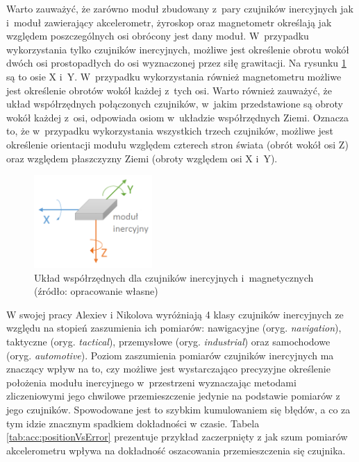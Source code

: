 Warto zauważyć, że zarówno moduł zbudowany z~pary czujników inercyjnych jak i~moduł zawierający akcelerometr, żyroskop oraz magnetometr określają jak względem poszczególnych osi obrócony jest dany moduł. W~przypadku wykorzystania tylko czujników inercyjnych, możliwe jest określenie obrotu wokół dwóch osi prostopadłych do osi wyznaczonej przez siłę grawitacji. Na rysunku \ref{fig:literature:imu:coordination} są to osie X i~Y. W~przypadku wykorzystania również magnetometru możliwe jest określenie obrotów wokół każdej z~tych osi. Warto również zauważyć, że układ współrzędnych połączonych czujników, w~jakim przedstawione są obroty wokół każdej z~osi, odpowiada osiom w~układzie współrzędnych Ziemi. Oznacza to, że w~przypadku wykorzystania wszystkich trzech czujników, możliwe jest określenie orientacji modułu względem czterech stron świata (obrót wokół osi Z) oraz względem płaszczyzny Ziemi (obroty względem osi X i~Y).
			 
\begin{savenotes}
	\begin{figure}[!htb]
		\centering	
		\includegraphics[width=0.4\textwidth]{images/IMUAxes.png}
		\caption{Układ współrzędnych dla czujników inercyjnych i~magnetycznych (źródło: opracowanie własne)}
		\label{fig:literature:imu:coordination}
	\end{figure}
\end{savenotes}

W swojej pracy Alexiev i Nikolova \cite{Alexiev2013} wyróżniają 4 klasy czujników inercyjnych ze względu na stopień zaszumienia ich pomiarów: nawigacyjne (oryg. \emph{navigation}), taktyczne (oryg. \emph{tactical}), przemysłowe (oryg. \emph{industrial}) oraz samochodowe (oryg. \emph{automotive}). Poziom zaszumienia pomiarów czujników inercyjnych ma znaczący wpływ na to, czy możliwe jest wystarczająco precyzyjne określenie położenia modułu inercyjnego w~przestrzeni wyznaczając metodami zliczeniowymi jego chwilowe przemieszczenie jedynie na podstawie pomiarów z jego czujników. Spowodowane jest to szybkim kumulowaniem się błędów, a co za tym idzie znacznym spadkiem dokładności w czasie. Tabela \ref{tab:acc:positionVsError} prezentuje przykład zaczerpnięty z \cite{Alexiev2013} jak szum pomiarów akcelerometru wpływa na dokładność oszacowania przemieszczenia się czujnika.

